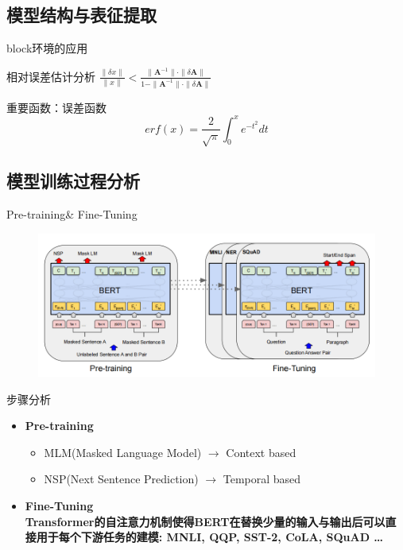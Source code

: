 \documentclass[UTF-8,fontset = none]{ctexbeamer}
\begin{document}
\subsection{模型结构与表征提取}

\begin{frame}{block环境的应用}
    \begin{alertblock}{相对误差估计分析}
        $\frac{\|\delta x\|}{\|x\|}<\frac{\|\bm{A}^{-1}\|\cdot\|\delta\bm{A}\|}{1-\|\bm{A}^{-1}\|\cdot\|\delta\bm{A}\|}$     
    \end{alertblock}
    \begin{block}{重要函数：误差函数}
       \begin{equation*}
           erf(x) = \frac{2}{\sqrt{\pi}}\int_{0}^{x}e^{-t^2}dt 
           \label{eq:erfF}
       \end{equation*}
    \end{block}
\end{frame}

\subsection{模型训练过程分析}
\begin{frame}{Pre-training\& Fine-Tuning}
    \begin{figure}[htpb]
        \begin{center}
            \includegraphics[width = 1\linewidth]{pic/StepOfBERT.png}
        \end{center}
    \end{figure}
\end{frame}

\begin{frame}{步骤分析}
\begin{itemize}
    \item \bfseries{Pre-training} 
    \begin{itemize} 
        \item MLM(Masked Language Model) $\rightarrow$ Context based
        \item NSP(Next Sentence Prediction) $\rightarrow$ Temporal based
    \end{itemize}
    \item \bfseries{Fine-Tuning} \\
    Transformer的自注意力机制使得BERT在替换少量的输入与输出后可以直接用于每个下游任务的建模: 
    MNLI, QQP, SST-2, CoLA, SQuAD \dots
\end{itemize}
\end{frame}
\end{document}
